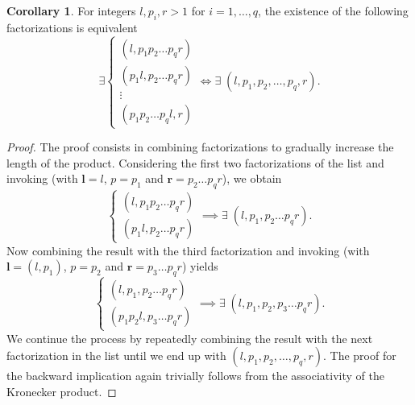 \documentclass{article}
\numberwithin{equation}{section}
\theoremstyle{definition}
\newtheorem{corollary}[definition]{Corollary}
\begin{document}
\begin{corollary}
\label{cor: cor_fact2}
For integers $l,p_i,r>1$ for $i=1,\dots,q$, the existence of the following factorizations is equivalent
\begin{equation*}
    \exists
    \begin{cases}
        (l, p_1p_2\dots p_q r) \\
        (p_1l, p_2\dots p_q r) \\
        \vdots \\
        (p_1 p_2 \dots p_q l, r)
    \end{cases}
    \iff \exists \; (l,p_1,p_2,\dots,p_q,r).
\end{equation*}
\end{corollary}
\begin{proof}
The proof consists in combining factorizations to gradually increase the length of the product. Considering the first two factorizations of the list and invoking  (with $\bm{l}=l$, $p=p_1$ and $\bm{r}=p_2\dots p_q r$), we obtain
\begin{equation*}
    \begin{cases}
        (l, p_1p_2\dots p_q r) \\
        (p_1l, p_2\dots p_q r)
    \end{cases}
    \implies \exists \; (l,p_1,p_2 \dots p_q r).
\end{equation*}
Now combining the result with the third factorization and invoking  (with $\bm{l}=(l,p_1)$, $p=p_2$ and $\bm{r}=p_3\dots p_q r$) yields
\begin{equation*}
    \begin{cases}
        (l, p_1, p_2\dots p_q r) \\
        (p_1p_2l, p_3\dots p_q r)
    \end{cases}
    \implies \exists \; (l,p_1,p_2,p_3 \dots p_q r).
\end{equation*}
We continue the process by repeatedly combining the result with the next factorization in the list until we end up with $(l,p_1,p_2,\dots,p_q,r)$. The proof for the backward implication again trivially follows from the associativity of the Kronecker product.
\end{proof}
\end{document}

